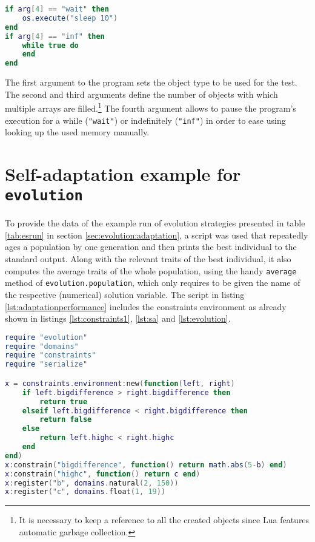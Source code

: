 \begin{appendices}
\begin{lstlisting}[language=lua, caption={Test program for memory measurement of different object types}, label=lst:ooperformance, name=lst:ooperformance]
if arg[4] == "wait" then
	os.execute("sleep 10")
end
if arg[4] == "inf" then
	while true do
	end
end
\end{lstlisting}
	
The first argument to the program sets the object type to be used for the test. The second and third arguments define the number of objects with which multiple arrays are filled.\footnote{It is necessary to keep a reference to all the created objects since Lua features automatic garbage collection.} The fourth argument allows to pause the program's execution for a while (\texttt{"wait"}) or indefinitely (\texttt{"inf"}) in order to ease using looking up the used memory manually.

\section{Self-adaptation example for \texttt{evolution}}
\label{sec:app:adaptation}

To provide the data of the example run of evolution strategies presented in table \ref{tab:esrun} in section \ref{sec:evolution:adaptation}, a script was used that repeatedly ages a population by one generation and then prints the best individual to the standard output. Along with the relevant traits of the best individual, it also computes the average traits of the whole population, using the handy \texttt{average} method of \texttt{evolution.population}, which only requires to be given the name of the respective (numerical) solution variable. The script in listing \ref{lst:adaptationperformance} includes the constraints environment as already shown in listings \ref{lst:constraints1}, \ref{lst:sa} and \ref{lst:evolution}.

\begin{lstlisting}[language=lua, caption={Test program for self-adaptation of the mutation rate in the module \texttt{evolution}}, label=lst:adaptationperformance, name=lst:adaptationperformance]
require "evolution"
require "domains"
require "constraints"
require "serialize"

x = constraints.environment:new(function(left, right)
	if left.bigdifference > right.bigdifference then
		return true
	elseif left.bigdifference < right.bigdifference then
		return false
	else
		return left.highc < right.highc
	end
end)
x:constrain("bigdifference", function() return math.abs(5-b) end)
x:constrain("highc", function() return c end)
x:register("b", domains.natural(2, 150))
x:register("c", domains.float(1, 19))


\end{lstlisting}
\end{appendices}
